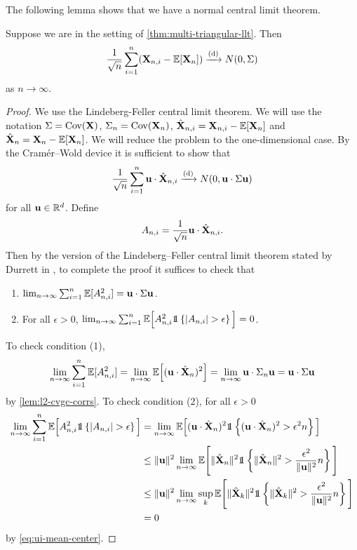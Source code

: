 The following lemma shows that we have a normal central limit theorem.
\begin{lemma}
    \label{lem:clt}
    Suppose we are in the setting of \cref{thm:multi-triangular-llt}. Then
    \begin{equation*}
        \frac{1}{\sqrt{n}} \sum_{i=1}^n ({\mathbf X}_{n, i} - {\mathbb E}[{\mathbf X}_n]) \xrightarrow[]{\mathrm{(d)}} N(0, \Sigma)
    \end{equation*}
    as $n \to \infty$.
\end{lemma}
\begin{proof}
    We use the Lindeberg-Feller central limit theorem. We will use the notation $\Sigma = \operatorname{Cov}({\mathbf X})$, $\Sigma_n = \operatorname{Cov}({\mathbf X}_n)$, $\hat{{\mathbf X}}_{n, i} = {\mathbf X}_{n, i} - {\mathbb E}[{\mathbf X}_n]$ and $\hat{{\mathbf X}}_n = {\mathbf X}_n - {\mathbb E}[{\mathbf X}_n]$. We will reduce the problem to the one-dimensional case. By the Cramér--Wold device it is sufficient to show that 
    \begin{equation*}
        \frac{1}{\sqrt{n}} \sum_{i=1}^n {\mathbf u} \cdot \hat{{\mathbf X}}_{n, i} \xrightarrow[]{\mathrm{(d)}}
        N(0, {\mathbf u} \cdot \Sigma {\mathbf u})
    \end{equation*}
    for all ${\mathbf u} \in {\mathbb R}^d$. Define
    \begin{equation*}
        A_{n, i} = \frac{1}{\sqrt{n}} {\mathbf u} \cdot \hat{{\mathbf X}}_{n, i}.
    \end{equation*}
    Then by the version of the Lindeberg--Feller central limit theorem stated by Durrett in \cite[P.128-129, Theorem 3.4.10]{durrettProbabilityTheoryExamples2019}, to complete the proof it suffices to check that
    \begin{enumerate}
        \item $\lim_{n \to \infty} \sum_{i=1}^n {\mathbb E}[A_{n, i}^2] = {\mathbf u} \cdot \Sigma {\mathbf u}$.
        \item For all $\epsilon > 0$, $\lim_{n \to \infty} \sum_{i=1}^n \E\Big[A_{n, i}^2 \one\left\{ \abs{A_{n, i}} > \epsilon \right\}\Big] = 0$.
    \end{enumerate}
    To check condition (1),
    \begin{align*}
        \lim_{n \to \infty} \sum_{i=1}^n {\mathbb E}[A_{n, i}^2]
        = \lim_{n \to \infty} {\mathbb E}\Big[ ({\mathbf u} \cdot \hat{{\mathbf X}}_n)^2 \Big]
        = \lim_{n \to \infty} {\mathbf u} \cdot \Sigma_n {\mathbf u}
        = {\mathbf u} \cdot \Sigma {\mathbf u}
    \end{align*}
    by \cref{lem:l2-cvgc-corrs}. To check condition (2), for all $\epsilon > 0$
    \begin{align*}
        \lim_{n \to \infty} \sum_{i=1}^n \E\Big[A_{n, i}^2 \one\left\{ \abs{A_{n, i}} > \epsilon \right\}\Big]
        &= \lim_{n \to \infty} \E\Big[ (\vu \cdot \hat{\vX}_n)^2 \one\left\{ (\vu \cdot \hat{\vX}_n)^2 > \epsilon^2 n \right\}\Big] \\
        &\leq \norm{\vu}^2 \lim_{n \to \infty} \E\Bigg[ \norm{\hat{\vX}_n}^2 \one\left\{ \norm{\hat{\vX}_n}^2 > \frac{\epsilon^2}{\norm{\vu}^2} n \right\}\Bigg] \\
        &\leq \norm{\vu}^2 \lim_{n \to \infty} \sup_k \E\Bigg[ \norm{\hat{\vX}_k}^2 \one\left\{ \norm{\hat{\vX}_k}^2 > \frac{\epsilon^2}{\norm{\vu}^2} n \right\}\Bigg] \\
        &= 0
    \end{align*}
    by \cref{eq:ui-mean-center}.
\end{proof}

